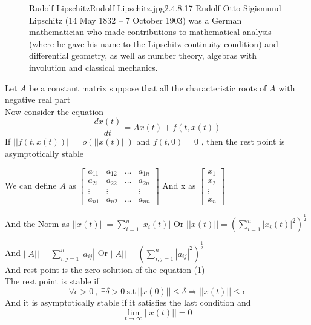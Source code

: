 \begin{figure}[b]
    \begin{enrichment}{Rudolf Lipschitz}{Rudolf Lipschitz.jpg}{2.4}{.8}{.17}
        Rudolf Otto Sigismund Lipschitz (14 May 1832 – 7 October 1903)
        was a German mathematician who made contributions to mathematical analysis
        (where he gave his name to the Lipschitz continuity condition) and differential geometry, as well as number theory, algebras with involution and classical mechanics.
    \end{enrichment}
\end{figure}
\setcounter{equation}{0}
\newpage
\begin{theorem}[]
    Let $A$ be a constant matrix suppose that all the characteristic roots of $A$ with negative real part
    \\
    Now consider the equation
    \[
        \frac{dx(t)}{dt} = Ax(t) + f(t,x(t))
    \]
    If $||f(t,x(t))|| = o(||x(t)||)$ and $f(t,0) = 0$ , then the rest point is asymptotically stable

    We can define $A$ as
    $\begin{bmatrix}
            a_{11} & a_{12} & \dots & a_{1n} \\
            a_{21} & a_{22} & \dots & a_{2n} \\
            \vdots & \vdots &       & \vdots \\
            a_{n1} & a_{n2} & \dots & a_{nn}
        \end{bmatrix}$
    And x as
    $\begin{bmatrix}
            x_{1}  \\
            x_{2}  \\
            \vdots \\
            x_{n}
        \end{bmatrix}$
    \par
    And the Norm as
    \(
    \displaystyle ||x(t)|| = \sum^{n}_{i=1}|x_i(t)|
    \)
    Or
    \(
    \displaystyle  ||x(t)|| = \left(\sum^{n}_{i=1}|x_i(t)|^2\right)^{\frac{1}{2}}
    \)
    \par
    And
    \(
    \displaystyle ||A|| = \sum^{n}_{i,j=1}|a_{ij}|
    \)
    Or
    \(
    \displaystyle ||A|| = \left(\sum^{n}_{i,j=1}|a_{ij}|^2\right)^{\frac{1}{2}}
    \)
    \\
    And rest point is the zero solution of the equation (1)
    \\
    The rest point is stable if
    \[
        \forall \epsilon >0 \  , \ \exists \delta >0 \ \text{s.t} \ || x(0)|| \leq \delta \Longrightarrow
        ||x(t)|| \leq \epsilon
    \]
    And it is asymptotically stable if it satisfies the last condition and
    \[
        \lim_{t \to \infty} ||x(t)|| = 0
    \]
\end{theorem}
